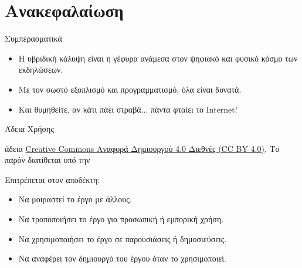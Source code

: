 \documentclass[aspectratio=169]{beamer}
\begin{document}
\section{Ανακεφαλαίωση}
\begin{frame}{Συμπερασματικά}
  \begin{itemize}
  \item Η υβριδική κάλυψη είναι η γέφυρα ανάμεσα στον ψηφιακό και φυσικό κόσμο των εκδηλώσεων.
  \item Με τον σωστό εξοπλισμό και προγραμματισμό, όλα είναι δυνατά.
  \item Και θυμηθείτε, αν κάτι πάει στραβά... πάντα φταίει το Internet!
  \end{itemize}
\end{frame}
\begin{frame}{Άδεια Χρήσης}     
\begin{center}
  \ccbysa
\end{center}
\begin{center}
 άδεια \href{https://creativecommons.org/licenses/by/4.0/}{Creative Commons Αναφορά Δημιουργού 4.0 Διεθνές (CC BY 4.0)}.  Το παρόν διατίθεται υπό την
  \ccbysa
\end{center}
\begin{exampleblock}{Επιτρέπεται στον αποδέκτη:}
\begin{itemize}
  \item Να μοιραστεί το έργο με άλλους.
  \item Να τροποποιήσει το έργο για προσωπική ή εμπορική χρήση.
  \item Να χρησιμοποιήσει το έργο σε παρουσιάσεις ή δημοσιεύσεις.
  \item Να αναφέρει τον δημιουργό του έργου όταν το χρησιμοποιεί.

\end{itemize}
\end{exampleblock}
\end{frame}
\end{document}
